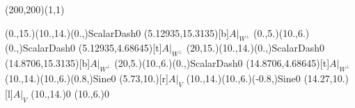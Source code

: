 \unitlength=1bp%

\begin{feynartspicture}(200,200)(1,1)

\FADiagram{}
\FAProp(0.,15.)(10.,14.)(0.,){ScalarDash}{0}
\FALabel(5.12935,15.3135)[b]{$A|_{W^\perp}$}
\FAProp(0.,5.)(10.,6.)(0.,){ScalarDash}{0}
\FALabel(5.12935,4.68645)[t]{$A|_{W^\perp}$}
\FAProp(20,15.)(10.,14.)(0.,){ScalarDash}{0}
\FALabel(14.8706,15.3135)[b]{$A|_{W^\perp}$}
\FAProp(20,5.)(10.,6.)(0.,){ScalarDash}{0}
\FALabel(14.8706,4.68645)[t]{$A|_{W^\perp}$}
\FAProp(10.,14.)(10.,6.)(0.8,){Sine}{0}
\FALabel(5.73,10.)[r]{$A|_V$}
\FAProp(10.,14.)(10.,6.)(-0.8,){Sine}{0}
\FALabel(14.27,10.)[l]{$A|_V$}
\FAVert(10.,14.){0}
\FAVert(10.,6.){0}
\end{feynartspicture}

